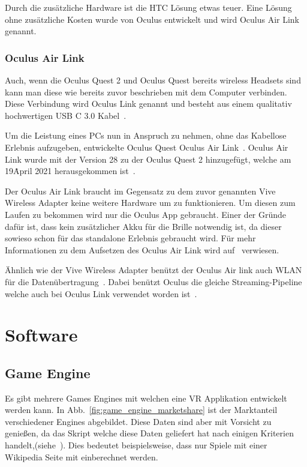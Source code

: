 Durch die zusätzliche Hardware ist die HTC Lösung etwas teuer.
Eine Lösung ohne zusätzliche Kosten wurde von Oculus entwickelt und wird Oculus Air Link genannt.

\subsubsection{Oculus Air Link}

Auch, wenn die Oculus Quest 2 und Oculus Quest bereits wireless Headsets sind kann man diese wie bereits zuvor beschrieben mit dem Computer verbinden.
Diese Verbindung wird Oculus Link genannt und besteht aus einem qualitativ hochwertigen USB C 3.0 Kabel~\cite{William_2020}.

Um die Leistung eines PCs nun in Anspruch zu nehmen, ohne das Kabellose Erlebnis aufzugeben, entwickelte Oculus Quest Oculus Air Link~\cite{Oculus_2021}.
Oculus Air Link wurde mit der Version 28 zu der Oculus Quest 2 hinzugefügt, welche am 19\. April 2021 herausgekommen ist~\cite{Oculus_2021, oculus_patchnotes}.

Der Oculus Air Link braucht im Gegensatz zu dem zuvor genannten Vive Wireless Adapter keine weitere Hardware um zu funktionieren.
Um diesen zum Laufen zu bekommen wird nur die Oculus App gebraucht.
Einer der Gründe dafür ist, dass kein zusätzlicher Akku für die Brille notwendig ist, da dieser sowieso schon für das standalone Erlebnis gebraucht wird.
Für mehr Informationen zu dem Aufsetzen des Oculus Air Link wird auf~\cite{Oculus_AirLink} verwiesen.

Ähnlich wie der Vive Wireless Adapter benützt der Oculus Air link auch WLAN für die Datenübertragung~\cite{Oculus_2021}.
Dabei benützt Oculus die gleiche Streaming-Pipeline welche auch bei Oculus Link verwendet worden ist~\cite{Oculus_2021}.

\section{Software}

\subsection{Game Engine}

Es gibt mehrere Games Engines mit welchen eine VR Applikation entwickelt werden kann.
In Abb.~\ref{fig:game_engine_marketshare} ist der Marktanteil verschiedener Engines abgebildet.
Diese Daten sind aber mit Vorsicht zu genießen, da das Skript welche diese Daten geliefert hat nach einigen Kriterien handelt,(siehe~\cite{REDDIT_2018}).
Dies bedeutet beispielsweise, dass nur Spiele mit einer Wikipedia Seite mit einberechnet werden.


